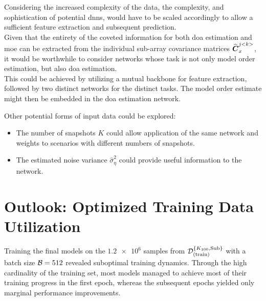 Considering the increased complexity of the data, the complexity, and sophistication of potential \glspl{dnn}, would have to
be scaled accordingly to allow a sufficient feature extraction and subsequent prediction. \\
Given that the entirety of the coveted information for both \gls{doa} estimation and \gls{moe} can be extracted from the individual sub-array covariance matrices
\( \widehat{\boldsymbol{C}}_x^{j<k>} \), it would be worthwhile to consider networks whose task is not only model order estimation, but also \gls{doa}
estimation. \\
This could be achieved by utilizing a mutual backbone for feature extraction, followed by two distinct networks for
the distinct tasks. The model order estimate might then be embedded in the \gls{doa} estimation network.

Other potential forms of input data could be explored:
\begin{itemize}
    \item The number of snapshots \( K \) could allow application of the same network and weights to scenarios with different numbers of snapshots.
    \item The estimated noise variance \( \hat{\sigma}^2_{\eta} \) could provide useful information to the network.
\end{itemize}


\section{Outlook: Optimized Training Data Utilization}
\label{subsub:optimized_training_data_utilization}
Training the final models on the \(\num{1.2e6}\) samples from \( \mathcal{D}^{\{K_{100},\text{Sub}\}}_{(\text{train})} \) with a batch size
\( \mathcal{B} = 512 \) revealed suboptimal training dynamics.
Through the high cardinality of the training set, most models managed to achieve most of their training progress in the first epoch,
whereas the subsequent epochs yielded only marginal performance improvements.\\

